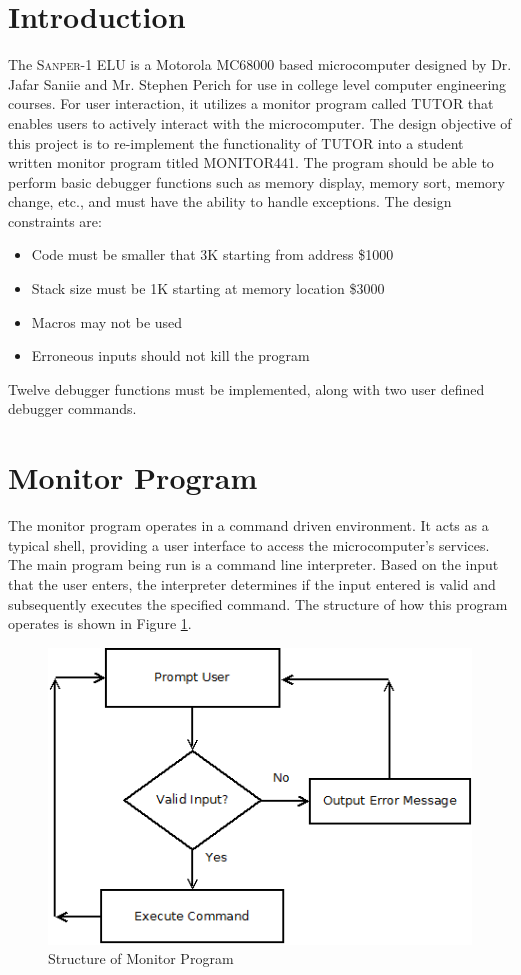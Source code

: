 \documentclass[12pt]{article}
\begin{document}
	\section{Introduction}
	The \textsc{Sanper-1 ELU} is a Motorola MC68000 based microcomputer designed by Dr. Jafar Saniie and Mr. Stephen Perich for use in college level computer engineering courses. For user interaction, it utilizes a monitor program called TUTOR that enables users to actively interact with the microcomputer. The design objective of this project is to re-implement the functionality of TUTOR into a student written monitor program titled MONITOR441. The program should be able to perform basic debugger functions such as memory display, memory sort, memory change, etc., and must have the ability to handle exceptions. The design constraints are:
	\begin{itemize}
		\item Code must be smaller that 3K starting from address \$1000
		\item Stack size must be 1K starting at memory location \$3000
		\item Macros may not be used
		\item Erroneous inputs should not kill the program
	\end{itemize}
	Twelve debugger functions must be implemented, along with two user defined debugger commands.
	
	\section{Monitor Program}
	The monitor program operates in a command driven environment. It acts as a typical shell, providing a user interface to access the microcomputer's services. The main program being run is a command line interpreter. Based on the input that the user enters, the interpreter determines if the input entered is valid and subsequently executes the specified command. The structure of how this program operates is shown in Figure \ref{fig:monitor}.
		\begin{figure}[H]
			\centering
			\includegraphics[width=0.7\linewidth]{monitor.png}
			\caption{Structure of Monitor Program}
			\label{fig:monitor}
		\end{figure}
		
\end{document}
